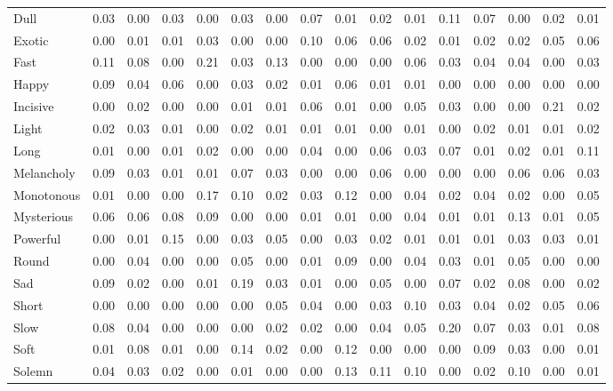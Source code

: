 \documentclass[
]{article}
\newenvironment{lltable}{\begin{landscape}\begin{center}\begin{ThreePartTable}}{\end{ThreePartTable}\end{center}\end{landscape}}
\begin{document}
\begin{lltable}
{\begin{longtable}{llllllllllllllll}
Dull & 0.03 & 0.00 & 0.03 & 0.00 & 0.03 & 0.00 & 0.07 & 0.01 & 0.02 & 0.01 & 0.11 & 0.07 & 0.00 & 0.02 & 0.01\\
Exotic & 0.00 & 0.01 & 0.01 & 0.03 & 0.00 & 0.00 & 0.10 & 0.06 & 0.06 & 0.02 & 0.01 & 0.02 & 0.02 & 0.05 & 0.06\\
Fast & 0.11 & 0.08 & 0.00 & 0.21 & 0.03 & 0.13 & 0.00 & 0.00 & 0.00 & 0.06 & 0.03 & 0.04 & 0.04 & 0.00 & 0.03\\
Happy & 0.09 & 0.04 & 0.06 & 0.00 & 0.03 & 0.02 & 0.01 & 0.06 & 0.01 & 0.01 & 0.00 & 0.00 & 0.00 & 0.00 & 0.00\\
Incisive & 0.00 & 0.02 & 0.00 & 0.00 & 0.01 & 0.01 & 0.06 & 0.01 & 0.00 & 0.05 & 0.03 & 0.00 & 0.00 & 0.21 & 0.02\\
Light & 0.02 & 0.03 & 0.01 & 0.00 & 0.02 & 0.01 & 0.01 & 0.01 & 0.00 & 0.01 & 0.00 & 0.02 & 0.01 & 0.01 & 0.02\\
Long & 0.01 & 0.00 & 0.01 & 0.02 & 0.00 & 0.00 & 0.04 & 0.00 & 0.06 & 0.03 & 0.07 & 0.01 & 0.02 & 0.01 & 0.11\\
Melancholy & 0.09 & 0.03 & 0.01 & 0.01 & 0.07 & 0.03 & 0.00 & 0.00 & 0.06 & 0.00 & 0.00 & 0.00 & 0.06 & 0.06 & 0.03\\
Monotonous & 0.01 & 0.00 & 0.00 & 0.17 & 0.10 & 0.02 & 0.03 & 0.12 & 0.00 & 0.04 & 0.02 & 0.04 & 0.02 & 0.00 & 0.05\\
Mysterious & 0.06 & 0.06 & 0.08 & 0.09 & 0.00 & 0.00 & 0.01 & 0.01 & 0.00 & 0.04 & 0.01 & 0.01 & 0.13 & 0.01 & 0.05\\
Powerful & 0.00 & 0.01 & 0.15 & 0.00 & 0.03 & 0.05 & 0.00 & 0.03 & 0.02 & 0.01 & 0.01 & 0.01 & 0.03 & 0.03 & 0.01\\
Round & 0.00 & 0.04 & 0.00 & 0.00 & 0.05 & 0.00 & 0.01 & 0.09 & 0.00 & 0.04 & 0.03 & 0.01 & 0.05 & 0.00 & 0.00\\
Sad & 0.09 & 0.02 & 0.00 & 0.01 & 0.19 & 0.03 & 0.01 & 0.00 & 0.05 & 0.00 & 0.07 & 0.02 & 0.08 & 0.00 & 0.02\\
Short & 0.00 & 0.00 & 0.00 & 0.00 & 0.00 & 0.05 & 0.04 & 0.00 & 0.03 & 0.10 & 0.03 & 0.04 & 0.02 & 0.05 & 0.06\\
Slow & 0.08 & 0.04 & 0.00 & 0.00 & 0.00 & 0.02 & 0.02 & 0.00 & 0.04 & 0.05 & 0.20 & 0.07 & 0.03 & 0.01 & 0.08\\
Soft & 0.01 & 0.08 & 0.01 & 0.00 & 0.14 & 0.02 & 0.00 & 0.12 & 0.00 & 0.00 & 0.00 & 0.09 & 0.03 & 0.00 & 0.01\\
Solemn & 0.04 & 0.03 & 0.02 & 0.00 & 0.01 & 0.00 & 0.00 & 0.13 & 0.11 & 0.10 & 0.00 & 0.02 & 0.10 & 0.00 & 0.01\\

\end{longtable}}
\end{lltable}
\end{document}
